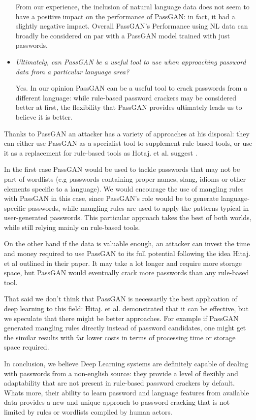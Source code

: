 \begin{itemize}
From our experience, the inclusion of natural language data does not seem to have a positive impact on the performance of PassGAN: in fact, it had a slightly negative impact. Overall PassGAN's Performance using NL data can broadly be considered on par with a PassGAN model trained with just passwords.
\clearpage 
\item \emph{Ultimately, can PassGAN be a useful tool to use when approaching password data from a particular language area?} %

Yes. In our opinion PassGAN can be a useful tool to crack passwords from a different language: while rule-based password crackers may be considered better at first, the flexibility that PassGAN provides ultimately leads us to believe it is better.

\end{itemize}
Thanks to PassGAN an attacker has a variety of approaches at his disposal: they can either use PassGAN as a specialist tool to supplement rule-based tools, or use it as a replacement for rule-based tools as Hotaj. et al. suggest \cite{PassGAN}. 

In the first case PassGAN would be used to tackle passwords that may not be part of wordlists (e.g passwords containing  proper names, slang, idioms or other elements specific to a language). 
We would encourage the use of mangling rules with PassGAN in this case, since  PassGAN's role would be to generate language-specific passwords, while mangling rules are used to apply the patterns typical in user-generated passwords. This particular approach takes the best of both worlds, while still relying mainly on rule-based tools.

On the other hand if the data is valuable enough, an attacker can invest the time and money required to use PassGAN to its full potential following the idea Hitaj. et al \cite{PassGAN} outlined in their paper. It may take a lot longer and require more storage space, but PassGAN would eventually crack more passwords than any rule-based tool.

That said we don't think that PassGAN is necessarily the best application of deep learning to this field: Hitaj. et al. demonstrated that it can be effective, but we speculate that there might be better approaches. For example if PassGAN generated mangling rules directly instead of password candidates, one might get the similar results with far lower costs in terms of processing time or storage space required.

In conclusion, we believe Deep Learning systems are definitely capable of dealing with passwords from a non-english source: they provide a level of flexibly and adaptability that are not present in rule-based password crackers by default. Whats more, their ability to learn password and language features from available data provides a new and unique approach to password cracking that is not limited by rules or wordlists compiled by human actors.
